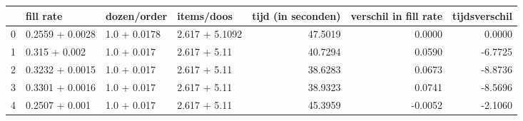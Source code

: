 \begin{tabular}{llllrrr}
\toprule
{} &        fill rate &   dozen/order &      items/doos &  tijd (in seconden) &  verschil in fill rate &  tijdsverschil \\
\midrule
0 &  0.2559 + 0.0028 &  1.0 + 0.0178 &  2.617 + 5.1092 &             47.5019 &                 0.0000 &         0.0000 \\
1 &    0.315 + 0.002 &   1.0 + 0.017 &    2.617 + 5.11 &             40.7294 &                 0.0590 &        -6.7725 \\
2 &  0.3232 + 0.0015 &   1.0 + 0.017 &    2.617 + 5.11 &             38.6283 &                 0.0673 &        -8.8736 \\
3 &  0.3301 + 0.0016 &   1.0 + 0.017 &    2.617 + 5.11 &             38.9323 &                 0.0741 &        -8.5696 \\
4 &   0.2507 + 0.001 &   1.0 + 0.017 &    2.617 + 5.11 &             45.3959 &                -0.0052 &        -2.1060 \\
\bottomrule
\end{tabular}
